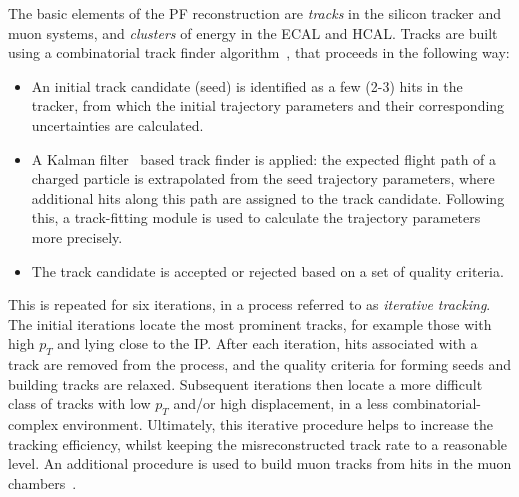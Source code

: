The basic elements of the PF reconstruction are \textit{tracks} in the silicon tracker and muon systems, and \textit{clusters} of energy in the ECAL and HCAL. Tracks are built using a combinatorial track finder algorithm~\cite{Chatrchyan:2014fea}, that proceeds in the following way:
\begin{itemize}
    \item An initial track candidate (seed) is identified as a few (2-3) hits in the tracker, from which the initial trajectory parameters and their corresponding uncertainties are calculated.
    \item A Kalman filter~\cite{BILLOIR1990219} based track finder is applied: the expected flight path of a charged particle is extrapolated from the seed trajectory parameters, where additional hits along this path are assigned to the track candidate. Following this, a track-fitting module is used to calculate the trajectory parameters more precisely.
    \item The track candidate is accepted or rejected based on a set of quality criteria.
\end{itemize}
\noindent
This is repeated for six iterations, in a process referred to as \textit{iterative tracking}. The initial iterations locate the most prominent tracks, for example those with high $p_T$ and lying close to the IP. After each iteration, hits associated with a track are removed from the process, and the quality criteria for forming seeds and building tracks are relaxed. Subsequent iterations then locate a more difficult class of tracks with low $p_T$ and/or high displacement, in a less combinatorial-complex environment. Ultimately, this iterative procedure helps to increase the tracking efficiency, whilst keeping the misreconstructed track rate to a reasonable level. An additional procedure is used to build muon tracks from hits in the muon chambers~\cite{Chatrchyan:2012xi}.

